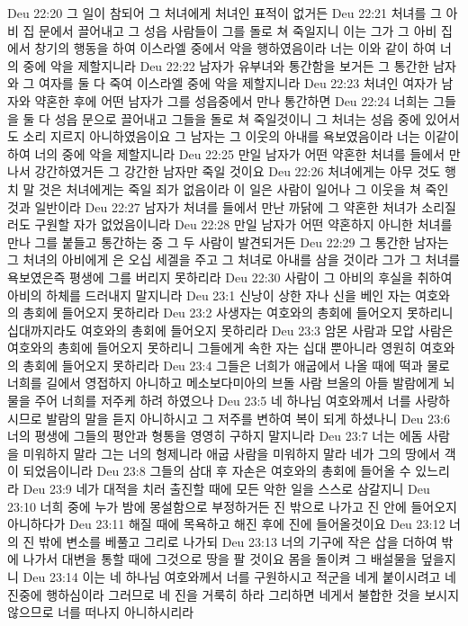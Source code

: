 Deu 22:20  그 일이 참되어 그 처녀에게 처녀인 표적이 없거든
Deu 22:21  처녀를 그 아비 집 문에서 끌어내고 그 성읍 사람들이 그를 돌로 쳐 죽일지니 이는 그가 그 아비 집에서 창기의 행동을 하여 이스라엘 중에서 악을 행하였음이라 너는 이와 같이 하여 너의 중에 악을 제할지니라
Deu 22:22  남자가 유부녀와 통간함을 보거든 그 통간한 남자와 그 여자를 둘 다 죽여 이스라엘 중에 악을 제할지니라
Deu 22:23  처녀인 여자가 남자와 약혼한 후에 어떤 남자가 그를 성읍중에서 만나 통간하면
Deu 22:24  너희는 그들을 둘 다 성읍 문으로 끌어내고 그들을 돌로 쳐 죽일것이니 그 처녀는 성읍 중에 있어서도 소리 지르지 아니하였음이요 그 남자는 그 이웃의 아내를 욕보였음이라 너는 이같이 하여 너의 중에 악을 제할지니라
Deu 22:25  만일 남자가 어떤 약혼한 처녀를 들에서 만나서 강간하였거든 그 강간한 남자만 죽일 것이요
Deu 22:26  처녀에게는 아무 것도 행치 말 것은 처녀에게는 죽일 죄가 없음이라 이 일은 사람이 일어나 그 이웃을 쳐 죽인 것과 일반이라
Deu 22:27  남자가 처녀를 들에서 만난 까닭에 그 약혼한 처녀가 소리질러도 구원할 자가 없었음이니라
Deu 22:28  만일 남자가 어떤 약혼하지 아니한 처녀를 만나 그를 붙들고 통간하는 중 그 두 사람이 발견되거든
Deu 22:29  그 통간한 남자는 그 처녀의 아비에게 은 오십 세겔을 주고 그 처녀로 아내를 삼을 것이라 그가 그 처녀를 욕보였은즉 평생에 그를 버리지 못하리라
Deu 22:30  사람이 그 아비의 후실을 취하여 아비의 하체를 드러내지 말지니라
Deu 23:1  신낭이 상한 자나 신을 베인 자는 여호와의 총회에 들어오지 못하리라
Deu 23:2  사생자는 여호와의 총회에 들어오지 못하리니 십대까지라도 여호와의 총회에 들어오지 못하리라
Deu 23:3  암몬 사람과 모압 사람은 여호와의 총회에 들어오지 못하리니 그들에게 속한 자는 십대 뿐아니라 영원히 여호와의 총회에 들어오지 못하리라
Deu 23:4  그들은 너희가 애굽에서 나올 때에 떡과 물로 너희를 길에서 영접하지 아니하고 메소보다미아의 브돌 사람 브올의 아들 발람에게 뇌물을 주어 너희를 저주케 하려 하였으나
Deu 23:5  네 하나님 여호와께서 너를 사랑하시므로 발람의 말을 듣지 아니하시고 그 저주를 변하여 복이 되게 하셨나니
Deu 23:6  너의 평생에 그들의 평안과 형통을 영영히 구하지 말지니라
Deu 23:7  너는 에돔 사람을 미워하지 말라 그는 너의 형제니라 애굽 사람을 미워하지 말라 네가 그의 땅에서 객이 되었음이니라
Deu 23:8  그들의 삼대 후 자손은 여호와의 총회에 들어올 수 있느리라
Deu 23:9  네가 대적을 치러 출진할 때에 모든 악한 일을 스스로 삼갈지니
Deu 23:10  너희 중에 누가 밤에 몽설함으로 부정하거든 진 밖으로 나가고 진 안에 들어오지 아니하다가
Deu 23:11  해질 때에 목욕하고 해진 후에 진에 들어올것이요
Deu 23:12  너의 진 밖에 변소를 베풀고 그리로 나가되
Deu 23:13  너의 기구에 작은 삽을 더하여 밖에 나가서 대변을 통할 때에 그것으로 땅을 팔 것이요 몸을 돌이켜 그 배설물을 덮을지니
Deu 23:14  이는 네 하나님 여호와께서 너를 구원하시고 적군을 네게 붙이시려고 네 진중에 행하심이라 그러므로 네 진을 거룩히 하라 그리하면 네게서 불합한 것을 보시지 않으므로 너를 떠나지 아니하시리라
